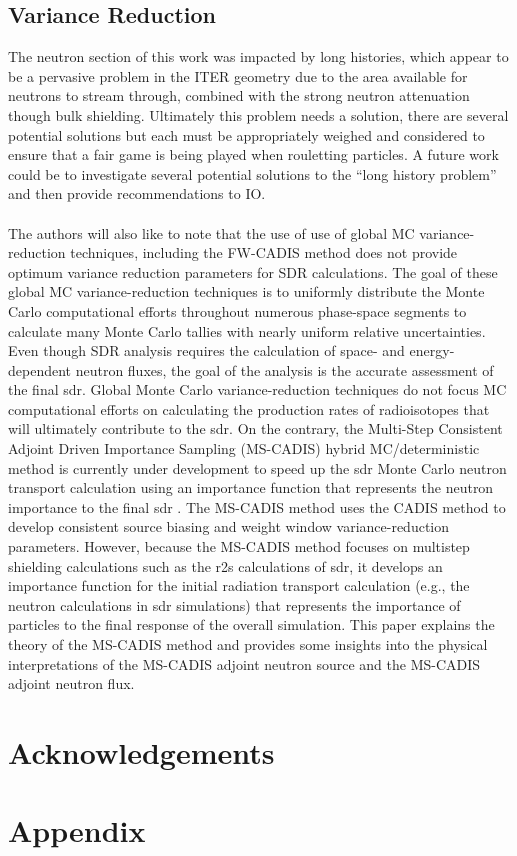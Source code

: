 \documentclass[12pt]{article}
\begin{document}
\subsection*{Variance Reduction}
The neutron section of this work was impacted by long histories, which appear to
be a pervasive problem in the ITER geometry due to the area available for
neutrons to stream through, combined with the strong neutron attenuation though
bulk shielding. Ultimately this problem needs a solution, there are several
potential solutions but each must be appropriately weighed and considered to
ensure that a fair game is being played when rouletting particles. A future
work could be to investigate several potential solutions to the ``long history
problem'' and then provide recommendations to IO.
\\
\\
The authors will also like to note that the use of use of global MC 
variance-reduction techniques, including the FW-CADIS method does not 
provide optimum variance reduction parameters for SDR calculations. 
The goal of these global MC variance-reduction techniques is to uniformly 
distribute the Monte Carlo computational efforts throughout numerous 
phase-space segments to calculate many Monte Carlo tallies with nearly 
uniform relative uncertainties. Even though SDR analysis requires the 
calculation of space- and energy-dependent neutron fluxes, the goal of 
the analysis is the accurate assessment of the final \gls{sdr}. Global 
Monte Carlo variance-reduction techniques do not focus MC computational 
efforts on calculating the production rates of radioisotopes that will 
ultimately contribute to the \gls{sdr}. On the contrary, the Multi-Step 
Consistent Adjoint Driven Importance Sampling (MS-CADIS) hybrid 
MC/deterministic method is currently under development to speed up the \gls{sdr}
 Monte Carlo neutron transport calculation using an importance function that 
represents the neutron importance to the final \gls{sdr} \cite{mscadis}. 
The MS-CADIS method uses the CADIS method to develop consistent source biasing 
and weight window variance-reduction parameters. However, because the MS-CADIS 
method focuses on multistep shielding calculations such as the \gls{r2s} 
calculations of \gls{sdr}, it develops an importance function for the initial 
radiation transport calculation (e.g., the neutron calculations in \gls{sdr} 
simulations) that represents the importance of particles to the final response
 of the overall simulation. This paper explains the theory of the MS-CADIS 
method and provides some insights into the physical interpretations of the 
MS-CADIS adjoint neutron source and the MS-CADIS adjoint neutron flux.
\section{Acknowledgements}
\newpage
\clearpage


\newpage
\clearpage
\section{Appendix}

\end{document}
